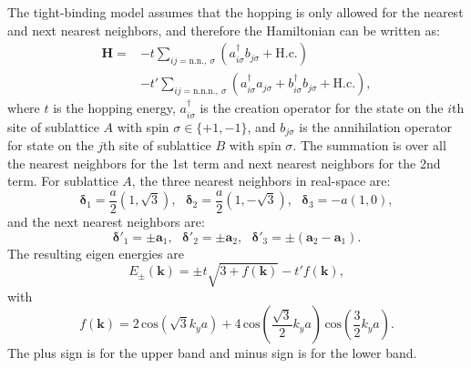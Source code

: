 \documentclass[pdflatex, sectionletters, 12pt]{pittetd}    %
\begin{document}
The tight-binding model assumes that the hopping is only allowed for the nearest and next nearest neighbors, and therefore the Hamiltonian can be written as\cite{wallace1947band, neto2009electronic}:
\begin{equation}
\begin{split}
\mathbf{H} = & - t \sum_{ij=\mathrm{n.n.}, \ \sigma} (a_{i\sigma}^{\dagger} b_{j\sigma} + \mathrm{H. c.}) \\
& - t' \sum_{ij=\mathrm{n.n.n.}, \ \sigma} (a_{i\sigma}^{\dagger} a_{j\sigma} + b_{i\sigma}^{\dagger} b_{j\sigma} + \mathrm{H. c.}),
\end{split}
\label{EQN:Hamiltonian}
\end{equation}
where $t$ is the hopping energy, $a_{i\sigma}^{\dagger}$ is the creation operator for the state on the $i$th site of sublattice $A$ with spin $\sigma\in\{+1, -1\}$, and $b_{j\sigma}$ is the annihilation operator for state on the $j$th site of sublattice $B$ with spin $\sigma$. The summation is over all the nearest neighbors for the 1st term and next nearest neighbors for the 2nd term. For sublattice $A$, the three nearest neighbors in real-space are: 
$$\mathbf{\delta}_1 = \frac{a}{2}\left(1, \sqrt{3}\right), \ \ \ \mathbf{\delta}_2 =  \frac{a}{2}\left(1, -\sqrt{3}\right), \ \ \ \mathbf{\delta}_3 = -a(1, 0),$$
and the next nearest neighbors are:
$$\mathbf{\delta}'_1 = \pm \mathbf{a}_1, \ \ \ \mathbf{\delta}'_2 =  \pm \mathbf{a}_2, \ \ \ \mathbf{\delta}'_3 = \pm (\mathbf{a}_2 - \mathbf{a}_1).$$
The resulting eigen energies are\cite{wallace1947band, neto2009electronic}
$$E_{\pm}(\mathbf{k}) = \pm t \sqrt{3 + f(\mathbf{k})} - t'f(\mathbf{k}),$$
with
$$f(\mathbf{k}) = 2 \, \mathrm{cos}\left( \sqrt{3} k_y a \right) + 4 \, \mathrm{cos}\left(\frac{\sqrt{3}}{2} k_y a \right) \, \mathrm{cos}\left( \frac{3}{2} k_y a \right).$$
The plus sign is for the upper band and minus sign is for the lower band. 
\end{document}
